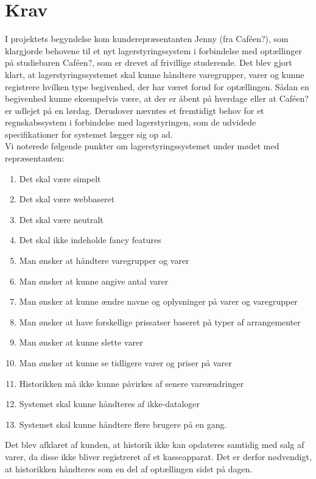 \documentclass[]{article}
\begin{document}
\section{Krav} \label{Krav}
I projektets begyndelse kom kunderepræsentanten Jenny (fra Caféen?), som klargjorde behovene til et nyt lagerstyringssystem i forbindelse med optællinger på studiebaren Caféen?, som er drevet af frivillige studerende. Det blev gjort klart, at lagerstyringssystemet skal kunne håndtere varegrupper, varer og kunne registrere hvilken type begivenhed, der har været forud for optællingen. Sådan en begivenhed kunne eksempelvis være, at der er åbent på hverdage eller at Caféen? er udlejet på en lørdag. Derudover nævntes et fremtidigt behov for et regnskabssystem i forbindelse med lagerstyringen, som de udvidede specifikationer for systemet lægger sig op ad. \\
Vi noterede følgende punkter om lagerstyringssystemet under mødet med repræsentanten:
\begin{enumerate}
	\setlength{\itemsep}{-3pt}
	\item Det skal være simpelt
	\item Det skal være webbaseret
	\item Det skal være neutralt
	\item Det skal ikke indeholde fancy features
	\item Man ønsker at håndtere varegrupper og varer
	\label{databaseOne}
	\item Man ønsker at kunne angive antal varer
	\item Man ønsker at kunne ændre navne og oplysninger på varer og varegrupper
	\item Man ønsker at have forskellige prissatser baseret på typer af arrangementer
	\item Man ønsker at kunne slette varer
	\label{databasetwo}
	\item Man ønsker at kunne se tidligere varer og priser på varer
	\item Historikken må ikke kunne påvirkes af senere vareændringer
	\item Systemet skal kunne håndteres af ikke-dataloger
	\item Systemet skal kunne håndtere flere brugere på en gang.
\end{enumerate}
\noindent Det blev afklaret af kunden, at historik ikke kan opdateres samtidig med salg af varer, da disse ikke bliver registreret af et kasseapparat. Det er derfor nødvendigt, at historikken håndteres som en del af optællingen sidst på dagen. \\
\end{document}
